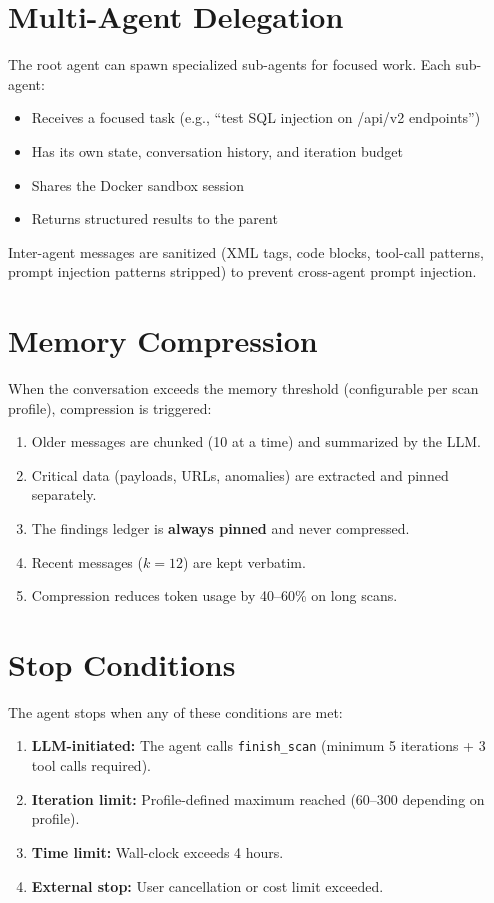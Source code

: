 \documentclass[12pt,a4paper]{report}
\begin{document}
\section{Multi-Agent Delegation}

The root agent can spawn specialized sub-agents for focused work. Each sub-agent:
\begin{itemize}
    \item Receives a focused task (e.g., ``test SQL injection on /api/v2 endpoints'')
    \item Has its own state, conversation history, and iteration budget
    \item Shares the Docker sandbox session
    \item Returns structured results to the parent
\end{itemize}

Inter-agent messages are sanitized (XML tags, code blocks, tool-call patterns, prompt injection patterns stripped) to prevent cross-agent prompt injection.

\section{Memory Compression}

When the conversation exceeds the memory threshold (configurable per scan profile), compression is triggered:

\begin{enumerate}
    \item Older messages are chunked (10 at a time) and summarized by the LLM.
    \item Critical data (payloads, URLs, anomalies) are extracted and pinned separately.
    \item The findings ledger is \textbf{always pinned} and never compressed.
    \item Recent messages ($k=12$) are kept verbatim.
    \item Compression reduces token usage by 40--60\% on long scans.
\end{enumerate}

\section{Stop Conditions}

The agent stops when any of these conditions are met:
\begin{enumerate}
    \item \textbf{LLM-initiated:} The agent calls \texttt{finish\_scan} (minimum 5 iterations + 3 tool calls required).
    \item \textbf{Iteration limit:} Profile-defined maximum reached (60--300 depending on profile).
    \item \textbf{Time limit:} Wall-clock exceeds 4 hours.
    \item \textbf{External stop:} User cancellation or cost limit exceeded.
\end{enumerate}
\end{document}
